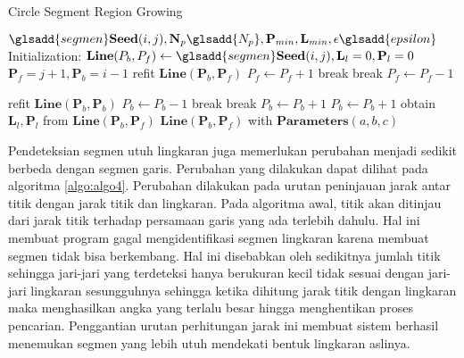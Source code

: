 \begin{algorithm}[H]
    \caption{Circle Segment Region Growing} 
    \label{algo:algo4}
    \begin{algorithmic}[1]
        \Require $\glsadd{segmen}\textbf{Seed} (i,j),\textbf{N}_{p}\glsadd{N_p}, \textbf{P}_{min}, \textbf{L}_{min}, \epsilon\glsadd{epsilon}$ 
        \State Initialization: $\textbf{Line}(P_{b},P_{f})\gets \glsadd{segmen}\textbf{Seed} (i,j),\textbf{L}_{l}=0, \textbf{P}_{l}=0 $
        \State $\textbf{P}_{f}=j+1, \textbf{P}_{b}=i-1$
                    \State refit $\textbf{Line}(\textbf{P}_{b}, \textbf{P}_{f})$
                    \State $P_{f} \gets P_{f}+1$
                \Else
                    \State break
                \EndIf
            \Else
                \State break
            \EndIf
            \State $P_{f} \gets P_{f}-1$
        \EndWhile

                    \State refit $\textbf{Line}(\textbf{P}_{b}, \textbf{P}_{b})$
                    \State $P_{b} \gets P_{b}-1$
                \Else
                    \State break
                \EndIf
            \Else
                \State break
            \EndIf
            \State $P_{b} \gets P_{b}+1$
        \EndWhile
        \State $P_{b} \gets P_{b}+1$
        \State obtain $\textbf{L}_{l}, \textbf{P}_{l}$ from $\textbf{Line}(\textbf{P}_{b}, \textbf{P}_{f})$
            \State \Return $\textbf{Line}(\textbf{P}_{b}, \textbf{P}_{f})$ with $\textbf{Parameters}(a,b,c)$
        \EndIf

    \end{algorithmic}
\end{algorithm}

Pendeteksian segmen utuh lingkaran juga memerlukan perubahan menjadi sedikit berbeda dengan segmen garis. Perubahan yang dilakukan dapat dilihat pada algoritma \ref*{algo:algo4}. Perubahan dilakukan pada urutan peninjauan jarak antar titik dengan jarak titik dan lingkaran. Pada algoritma awal, titik akan ditinjau dari jarak titik terhadap persamaan garis yang ada terlebih dahulu. Hal ini membuat program gagal mengidentifikasi segmen lingkaran karena membuat segmen tidak bisa berkembang. Hal ini disebabkan oleh sedikitnya jumlah titik sehingga jari-jari yang terdeteksi hanya berukuran kecil tidak sesuai dengan jari-jari lingkaran sesungguhnya sehingga ketika dihitung jarak titik dengan lingkaran maka menghasilkan angka yang terlalu besar hingga menghentikan proses pencarian. Penggantian urutan perhitungan jarak ini membuat sistem berhasil menemukan segmen yang lebih utuh mendekati bentuk lingkaran aslinya.

